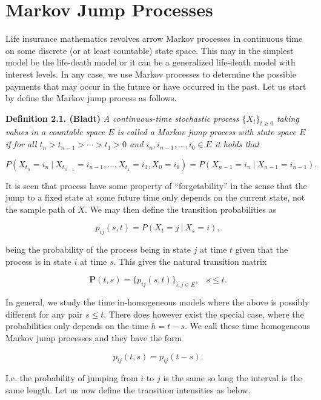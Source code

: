 \documentclass[a4paper,12pt,openany]{book}
\begin{document}
\hypertarget{markov-jump-processes}{%
\section{Markov Jump Processes}\label{markov-jump-processes}}

Life insurance mathematics revolves arrow Markov processes in continuous time on some discrete (or at least countable) state space. This may in the simplest model be the life-death model or it can be a generalized life-death model with interest levels. In any case, we use Markov processes to determine the possible payments that may occur in the future or have occurred in the past. Let us start by define the Markov jump process as follows.

\textbf{Definition 2.1. (Bladt)} \emph{A continuous-time stochastic process \(\{X_t\}_{t\ge 0}\) taking values in a countable space \(E\) is called a Markov jump process with state space \(E\) if for all \(t_n>t_{n-1}>\cdots > t_1>0\) and \(i_n,i_{n-1},...,i_0\in E\) it holds that}

\[
P(X_{t_n}=i_n \ \vert\ X_{t_{n-1}}=i_{n-1},...,X_{t_1}=i_1,X_0=i_0)=P(X_{n-1}=i_n\ \vert\ X_{n-1}=i_{n-1}).
\]

It is seen that process have some property of ``forgetability'' in the sense that the jump to a fixed state at some future time only depends on the current state, not the sample path of \(X\). We may then define the transition probabilities as

\[
p_{ij}(s,t)=P(X_t=j\ \vert\ X_s=i),
\]

being the probability of the process being in state \(j\) at time \(t\) given that the process is in state \(i\) at time \(s\). This gives the natural transition matrix

\[
\mathbf{P}(t,s)=\big\{p_{ij}(s,t)\big\}_{i,j\in E},\hspace{10pt} s\le t.
\]

In general, we study the time in-homogeneous models where the above is possibly different for any pair \(s\le t\). There does however exist the special case, where the probabilities only depends on the time \(h=t-s\). We call these time homogeneous Markov jump processes and they have the form

\[
p_{ij}(t,s)=p_{ij}(t-s).
\]

I.e. the probability of jumping from \(i\) to \(j\) is the same so long the interval is the same length. Let us now define the transition intensities as below.
\end{document}
